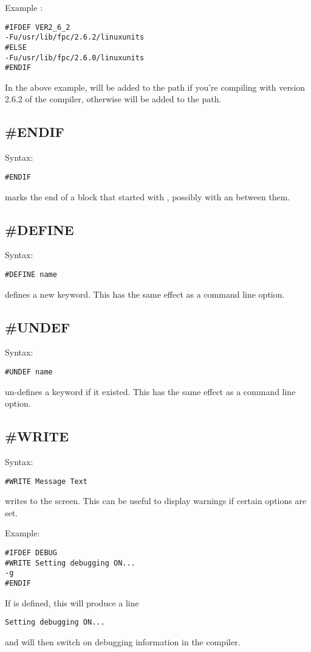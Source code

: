 Example :
\begin{verbatim}
#IFDEF VER2_6_2
-Fu/usr/lib/fpc/2.6.2/linuxunits
#ELSE
-Fu/usr/lib/fpc/2.6.0/linuxunits
#ENDIF
\end{verbatim}
In the above example,  will be added to
the path if you're compiling with version 2.6.2 of the compiler,
otherwise  will be added to the path.

\subsection{\#ENDIF}
Syntax:
\begin{verbatim}
#ENDIF
\end{verbatim}
 marks the end of a block that started with ,
possibly with an  between them.

\subsection{\#DEFINE}
Syntax:
\begin{verbatim}
#DEFINE name
\end{verbatim}
 defines a new keyword. This has the same effect as a
  command line option.

\subsection{\#UNDEF}
Syntax:
\begin{verbatim}
#UNDEF name
\end{verbatim}
 un-defines a keyword if it existed.
This has the same effect as a   command line option.

\subsection{\#WRITE}
Syntax:
\begin{verbatim}
#WRITE Message Text
\end{verbatim}
 writes  to the screen.
This can be useful to display warnings if certain options are set.

Example:
\begin{verbatim}
#IFDEF DEBUG
#WRITE Setting debugging ON...
-g
#ENDIF
\end{verbatim}
If  is defined, this will produce a line
\begin{verbatim}
Setting debugging ON...
\end{verbatim}
and will then switch on debugging information in the compiler.

